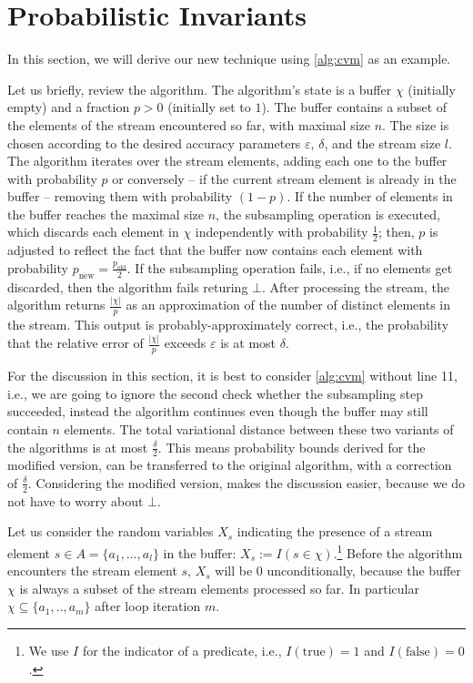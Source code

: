 \section{Probabilistic Invariants}\label{sec:invariants}
In this section, we will derive our new technique using \cref{alg:cvm} as an example. 

Let us briefly, review the algorithm. The algorithm's state is a buffer $\chi$ (initially empty) and a fraction $p > 0$ (initially set to $1$).
The buffer contains a subset of the elements of the stream encountered so far, with maximal size $n$.
The size is chosen according to the desired accuracy parameters $\varepsilon$, $\delta$, and the stream size $l$.
The algorithm iterates over the stream elements, adding each one to the buffer with probability $p$ or conversely -- if the current stream element is already in the buffer -- removing them with probability $(1-p)$.
If the number of elements in the buffer reaches the maximal size $n$, the subsampling operation is executed, which discards each element in $\chi$ independently with probability $\frac{1}{2}$; then, $p$ is adjusted to reflect the fact that the buffer now contains each element with probability $p_\text{new} = \frac{p_\text{old}}{2}$.
If the subsampling operation fails, i.e., if no elements get discarded, then the algorithm fails returing $\bot$.
After processing the stream, the algorithm returns $\frac{|\chi|}{p}$ as an approximation of the number of distinct elements in the stream.
This output is probably-approximately correct, i.e., the probability that the relative error of $\frac{|\chi|}{p}$ exceeds $\varepsilon$ is at most $\delta$.

For the discussion in this section, it is best to consider \cref{alg:cvm} without line 11, i.e., we are going to ignore the second check whether the subsampling step succeeded, instead the algorithm continues even though the buffer may still contain $n$ elements.
The total variational distance between these two variants of the algorithms is at most $\frac{\delta}{2}$.
This means probability bounds derived for the modified version, can be transferred to the original algorithm, with a correction of $\frac{\delta}{2}$.
Considering the modified version, makes the discussion easier, because we do not have to worry about $\bot$.

Let us consider the random variables $X_s$ indicating the presence of a stream element $s \in A = \{a_1,\ldots,a_l\}$ in the buffer: $X_s := I(s \in \chi)$.\footnote{We use $I$ for the indicator of a predicate, i.e., $I(\mathrm{true}) = 1$ and $I(\mathrm{false}) = 0$.} 
Before the algorithm encounters the stream element $s$, $X_s$ will be $0$ unconditionally, because the buffer $\chi$ is always a subset of the stream elements processed so far.
In particular $\chi \subseteq \{a_1,..,a_m\}$ after loop iteration $m$.

